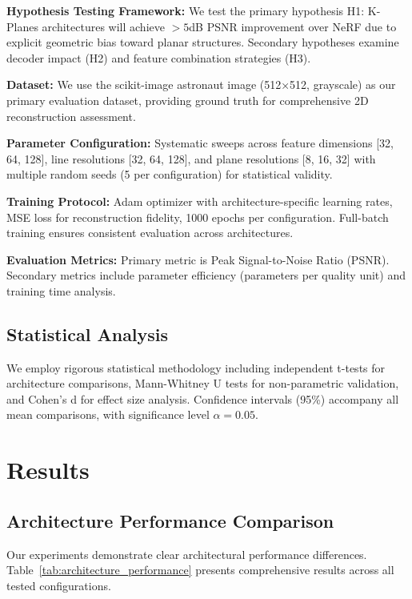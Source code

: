 \documentclass{article}
\begin{document}
\textbf{Hypothesis Testing Framework:} We test the primary hypothesis H1: K-Planes architectures will achieve $>5$dB PSNR improvement over NeRF due to explicit geometric bias toward planar structures. Secondary hypotheses examine decoder impact (H2) and feature combination strategies (H3).

\textbf{Dataset:} We use the scikit-image astronaut image (512×512, grayscale) as our primary evaluation dataset, providing ground truth for comprehensive 2D reconstruction assessment.

\textbf{Parameter Configuration:} Systematic sweeps across feature dimensions [32, 64, 128], line resolutions [32, 64, 128], and plane resolutions [8, 16, 32] with multiple random seeds (5 per configuration) for statistical validity.

\textbf{Training Protocol:} Adam optimizer with architecture-specific learning rates, MSE loss for reconstruction fidelity, 1000 epochs per configuration. Full-batch training ensures consistent evaluation across architectures.

\textbf{Evaluation Metrics:} Primary metric is Peak Signal-to-Noise Ratio (PSNR). Secondary metrics include parameter efficiency (parameters per quality unit) and training time analysis.

\subsection{Statistical Analysis}

We employ rigorous statistical methodology including independent t-tests for architecture comparisons, Mann-Whitney U tests for non-parametric validation, and Cohen's d for effect size analysis. Confidence intervals (95\%) accompany all mean comparisons, with significance level $\alpha = 0.05$.

\section{Results}

\subsection{Architecture Performance Comparison}

Our experiments demonstrate clear architectural performance differences. Table~\ref{tab:architecture_performance} presents comprehensive results across all tested configurations.
\end{document}
